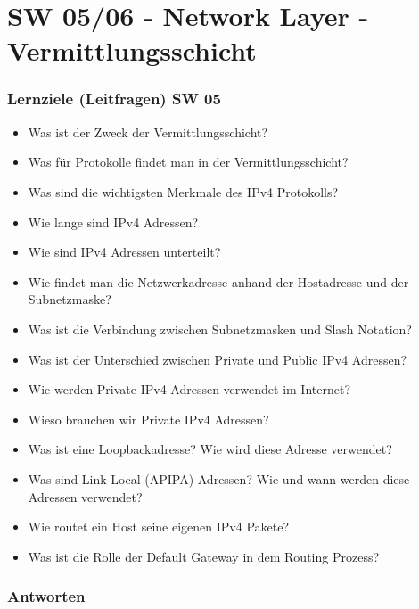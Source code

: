 \part{SW 05/06 - Network Layer - Vermittlungsschicht}\label{part:sw0506}
\section{Lernziele (Leitfragen) SW 05}
\begin{itemize}
    \item Was ist der Zweck der Vermittlungsschicht?
    \item Was für Protokolle findet man in der Vermittlungsschicht?
    \item Was sind die wichtigsten Merkmale des IPv4 Protokolls?
    \item Wie lange sind IPv4 Adressen?
    \item Wie sind IPv4 Adressen unterteilt?
    \item Wie findet man die Netzwerkadresse anhand der Hostadresse und der Subnetzmaske?
    \item Was ist die Verbindung zwischen Subnetzmasken und \flqq Slash Notation\frqq{}?
    \item Was ist der Unterschied zwischen Private und Public IPv4 Adressen?
    \item Wie werden Private IPv4 Adressen verwendet im Internet?
    \item Wieso brauchen wir Private IPv4 Adressen?
    \item Was ist eine Loopbackadresse? Wie wird diese Adresse verwendet?
    \item Was sind \flqq Link-Local\frqq{} (APIPA) Adressen? Wie und wann werden diese Adressen verwendet?
    \item Wie routet ein Host seine eigenen IPv4 Pakete?
    \item Was ist die Rolle der Default Gateway in dem Routing Prozess?
\end{itemize}

\section{Antworten}
